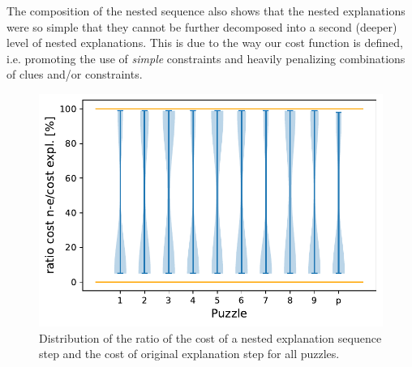 The composition of the nested sequence also shows that the nested explanations were so simple that they cannot be further decomposed into a second (deeper) level of nested explanations. This is due to the way our cost function is defined, i.e. promoting the use of \emph{simple} constraints and heavily penalizing combinations of clues and/or constraints.


\begin{figure}[h]
	\centering
	\includegraphics[width=.6\textwidth]{figures/violin_plot.pdf}
	\caption{Distribution of the ratio of the cost of a nested explanation sequence step and the cost of original explanation step for all puzzles. 
	} 
	\label{fig:experiments:violin}
\end{figure}

$ $

